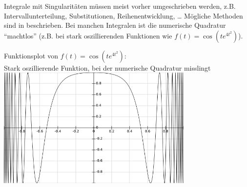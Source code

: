 Integrale mit Singularitäten müssen meist vorher 
umgeschrieben werden, z.B. Intervallunterteilung,
Substitutionen, Reihenentwicklung, …
Mögliche Methoden sind in \cite{stoer} beschrieben.
Bei manchen Integralen ist die numerische Quadratur \enquote{machtlos} 
(z.B. bei stark oszillierenden Funktionen wie
$f(t) = \cos(te^{4t^2})$).
\begin{image}{Funktionsplot von $f(t) = \cos(te^{4t^2})$:\\
    Stark oszillierende Funktion, bei der numerische
    Quadratur misslingt}
  \includegraphics[height=6cm]{images/stark_oszi_funktion.png}
\end{image}


